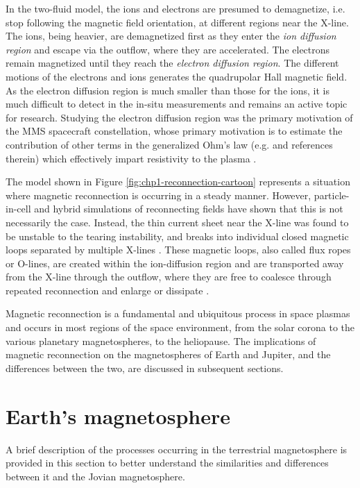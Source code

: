 In the two-fluid model, the ions and electrons are presumed to demagnetize, i.e. stop following the magnetic field orientation, at different regions near the X-line. The ions, being heavier, are demagnetized first as they enter the \emph{ion diffusion region} and escape via the outflow, where they are accelerated. The electrons remain magnetized until they reach the \emph{electron diffusion region}. The different motions of the electrons and ions generates the quadrupolar Hall magnetic field. As the electron diffusion region is much smaller than those for the ions, it is much difficult to detect in the in-situ measurements and remains an active topic for research. Studying the electron diffusion region was the primary motivation of the MMS spacecraft constellation, whose primary motivation is to estimate the contribution of other terms in the generalized Ohm's law (e.g.  and references therein) which effectively impart resistivity to the plasma \cite{Burch2016MagnetosphericObjectives}.  

The model shown in Figure \ref{fig:chp1-reconnection-cartoon} represents a situation where magnetic reconnection is occurring in a steady manner. However, particle-in-cell and hybrid simulations of reconnecting fields have shown that this is not necessarily the case. Instead, the thin current sheet near the X-line was found to be unstable to the tearing instability, and breaks into individual closed magnetic loops separated by multiple X-lines \cite{Drake2006ElectronReconnection,Drake2006FormationReconnection}. These magnetic loops, also called flux ropes or O-lines, are created within the ion-diffusion region and are transported away from the X-line through the outflow, where they are free to coalesce through repeated reconnection and enlarge or dissipate \cite{Markidis2012CollisionlessChain,Wang2016CoalescenceReconnection}. 

Magnetic reconnection is a fundamental and ubiquitous process in space plasmas and occurs in most regions of the space environment, from the solar corona to the various planetary magnetospheres, to the heliopause. The implications of magnetic reconnection on the magnetospheres of Earth and Jupiter, and the differences between the two, are discussed in subsequent sections.


\section{Earth's magnetosphere}
A brief description of the processes occurring in the terrestrial magnetosphere is provided in this section to better understand the similarities and differences between it and the Jovian magnetosphere.

